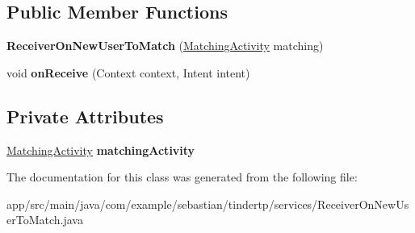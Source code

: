 \subsection*{Public Member Functions}
\begin{DoxyCompactItemize}
\item 
{\bfseries Receiver\+On\+New\+User\+To\+Match} (\hyperlink{classcom_1_1example_1_1sebastian_1_1tindertp_1_1MatchingActivity}{Matching\+Activity} matching)\hypertarget{classcom_1_1example_1_1sebastian_1_1tindertp_1_1services_1_1ReceiverOnNewUserToMatch_a20173e9307d37aa6fad9e7662b615868}{}\label{classcom_1_1example_1_1sebastian_1_1tindertp_1_1services_1_1ReceiverOnNewUserToMatch_a20173e9307d37aa6fad9e7662b615868}

\item 
void {\bfseries on\+Receive} (Context context, Intent intent)\hypertarget{classcom_1_1example_1_1sebastian_1_1tindertp_1_1services_1_1ReceiverOnNewUserToMatch_a3be4b4d8f52661254379706c648b9f18}{}\label{classcom_1_1example_1_1sebastian_1_1tindertp_1_1services_1_1ReceiverOnNewUserToMatch_a3be4b4d8f52661254379706c648b9f18}

\end{DoxyCompactItemize}
\subsection*{Private Attributes}
\begin{DoxyCompactItemize}
\item 
\hyperlink{classcom_1_1example_1_1sebastian_1_1tindertp_1_1MatchingActivity}{Matching\+Activity} {\bfseries matching\+Activity}\hypertarget{classcom_1_1example_1_1sebastian_1_1tindertp_1_1services_1_1ReceiverOnNewUserToMatch_acccc2c5700e913381baa4673801fdbe0}{}\label{classcom_1_1example_1_1sebastian_1_1tindertp_1_1services_1_1ReceiverOnNewUserToMatch_acccc2c5700e913381baa4673801fdbe0}

\end{DoxyCompactItemize}


The documentation for this class was generated from the following file\+:\begin{DoxyCompactItemize}
\item 
app/src/main/java/com/example/sebastian/tindertp/services/Receiver\+On\+New\+User\+To\+Match.\+java\end{DoxyCompactItemize}

